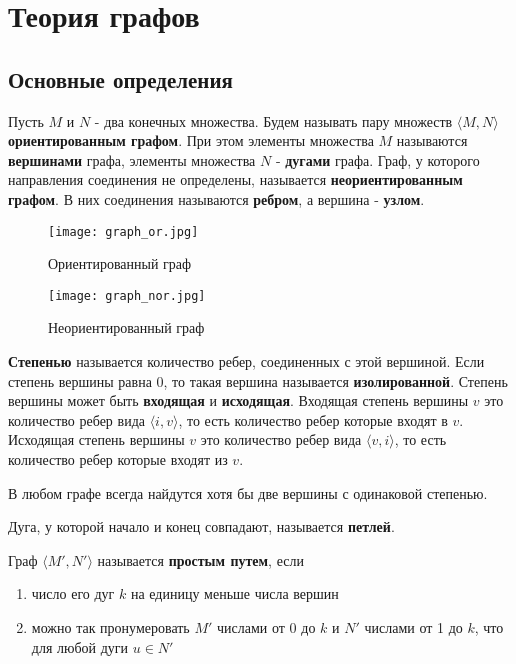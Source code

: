 \chapter{Теория графов}
\section{Основные определения}
Пусть $M$ и $N$ - два конечных множества. Будем называть пару множеств $\langle M, N \rangle$ \textbf{ориентированным графом}.
При этом элементы множества $M$ называются \textbf{вершинами} графа, элементы множества $N$ - \textbf{дугами} графа. 
Граф, у которого направления соединения не определены, называется \textbf{неориентированным графом}. В них
соединения называются \textbf{ребром}, а вершина - \textbf{узлом}.

\begin{figure*}[!h]
    \centering
    \begin{minipage}[t]{4cm}
        \centering
        \texttt{[image: graph\_or.jpg]}
        \caption{Ориентированный граф}
    \end{minipage}
    \hspace{3cm}
    \begin{minipage}[t]{4cm}
        \centering
        \texttt{[image: graph\_nor.jpg]}
        \caption{Неориентированный граф}
    \end{minipage}
\end{figure*}

\textbf{Степенью} называется количество ребер, соединенных с этой вершиной.
Если степень вершины равна 0, то такая вершина называется \textbf{изолированной}.
Степень вершины может быть \textbf{входящая} и \textbf{исходящая}. Входящая степень вершины $v$
это количество ребер вида $\langle i, v \rangle$, то есть количество ребер которые входят в $v$.
Исходящая степень вершины $v$ это количество ребер вида $\langle v, i \rangle$, то есть количество ребер
которые входят из $v$.

\begin{thm}
    В любом графе всегда найдутся хотя бы две вершины с одинаковой степенью.
\end{thm}

Дуга, у которой начало и конец совпадают, называется \textbf{петлей}.

Граф $\langle M', N'\rangle$ называется \textbf{простым путем}, если
\begin{enumerate}
    \item число его дуг $k$ на единицу меньше числа вершин
    \item можно так пронумеровать $M'$ числами от 0 до $k$ и $N'$ числами от 1 до $k$,
    что для любой дуги $u \in N'$
\end{enumerate}

